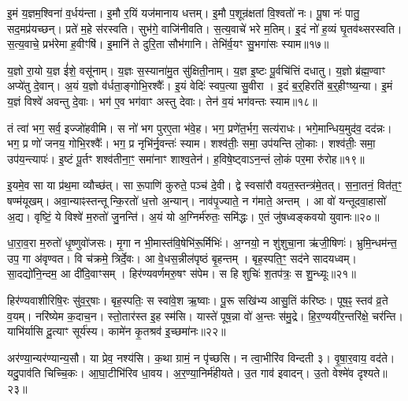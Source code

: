 इ॒मं य॒ज्ञम॒श्विना॑ व॒र्धय॑न्ता।
इ॒मौ र॒यिं यज॑मानाय धत्तम्।
इ॒मौ प॒शून्र॑क्षतां वि॒श्वतो॑ नः।
पू॒षा नः॑ पातु॒ सद॒मप्र॑यच्छन्।
प्रते॑ म॒हे स॑रस्वति।
सुभ॑गे॒ वाजि॑नीवति।
स॒त्य॒वाचे॑ भरे म॒तिम्।
इ॒दं नो॑ ह॒व्यं घृ॒तव॑थ्सरस्वति।
स॒त्य॒वाचे॒ प्रभ॑रेमा ह॒वीꣳषि॑।
इ॒मानि॑ ते दुरि॒ता सौभ॑गानि।
तेभि॑र्व॒यꣳ सु॒भगा॑सः स्याम॥१७॥\anuvakamend[व॒ज्र्यही॑नामृजी॒षं व्यृ॑ण्वति रक्षतु नो र॒यिꣳ सौभ॑गा॒न्येकं॑ च]

य॒ज्ञो रा॒यो य॒ज्ञ ई॑शे॒ वसू॑नाम्।
य॒ज्ञः स॒स्याना॑मु॒त सु॑क्षिती॒नाम्।
य॒ज्ञ इ॒ष्टः पू॒र्वचि॑त्तिं दधातु।
य॒ज्ञो ब्र॑ह्म॒ण्वाꣳ अप्ये॑तु दे॒वान्।
अ॒यं य॒ज्ञो व॑र्धता॒ङ्गोभि॒रश्वैः᳚।
इ॒यं वेदिः॑ स्वप॒त्या सु॒वीरा।
इ॒दं ब॒र्॒हिरति॑ ब॒र्॒हीꣳष्य॒न्या।
इ॒मं य॒ज्ञं विश्वे॑ अवन्तु दे॒वाः।
भग॑ ए॒व भग॑वाꣳ अस्तु देवाः।
तेन॑ व॒यं भग॑वन्तः स्याम॥१८॥

तं त्वा॑ भग॒ सर्व॒ इज्जो॑हवीमि।
स नो॑ भग पुरए॒ता भ॑वे॒ह।
भग॒ प्रणे॑त॒र्भग॒ सत्य॑राधः।
भगे॒मान्धिय॒मुद॑व॒ दद॑न्नः।
भग॒ प्र णो॑ जनय॒ गोभि॒रश्वैः᳚।
भग॒ प्र नृभि॑र्नृ॒वन्तः॑ स्याम।
शश्व॑तीः॒ समा॒ उप॑यन्ति लो॒काः।
शश्व॑तीः॒ समा॒ उप॑य॒न्त्यापः॑।
इ॒ष्टं पू॒र्तꣳ शश्व॑तीना॒ꣳ॒ समा॑नाꣳ शाश्व॒तेन॑।
ह॒विषे॒ष्ट्वा\-ऽन॒न्तं लो॒कं पर॒मा रु॑रोह॥१९॥

इ॒यमे॒व सा या प्र॑थ॒मा व्यौच्छ॑त्।
सा रू॒पाणि॑ कुरुते॒ पञ्च॑ दे॒वी।
द्वे स्वसा॑रौ वयत॒स्तन्त्र॑मे॒तत्।
स॒ना॒तनं॒ वित॑त॒ꣳ॒ षण्म॑यूखम्।
अवा॒न्याꣴस्तन्तून्कि॒रतो॑ ध॒त्तो अ॒न्यान्।
नाव॑पृ॒ज्याते॒ न ग॑माते॒ अन्तम्।
आ वो॑ यन्तूदवा॒हासो॑ अ॒द्य।
वृष्टिं॒ ये विश्वे॑ म॒रुतो॑ जु॒नन्ति॑।
अ॒यं यो अ॒ग्निर्म॑रुतः॒ समि॑द्धः।
ए॒तं जु॑षध्वङ्कवयो युवानः॥२०॥

धा॒रा॒व॒रा म॒रुतो॑ धृ॒ष्णुवो॑जसः।
मृ॒गा न भी॒मास्त॑वि॒षेभि॑\-रू॒र्मिभिः॑।
अ॒ग्नयो॒ न शु॑शुचा॒ना ऋ॑जी॒षिणः॑।
भ्रुमि॒न्धम॑न्त॒ उप॒ गा अ॑वृण्वत।
वि च॑क्रमे॒ त्रिर्दे॒वः।
आ वे॒धस॒न्नील॑पृष्ठं बृ॒हन्तम्।
बृह॒स्पति॒ꣳ॒ सद॑ने सादयध्वम्।
सा॒दद्यो॑नि॒न्दम॒ आ दी॑दि॒वाꣳसम्।
हिर॑ण्यवर्णमरु॒षꣳ स॑पेम।
स हि शुचिः॑ श॒तप॑त्रः॒ स शु॒न्ध्यूः॥२१॥

हिर॑ण्यवाशीरिषि॒रः सु॑व॒र्॒षाः।
बृह॒स्पतिः॒ स स्वा॑वे॒श ऋ॒ष्वाः।
पू॒रू सखि॑भ्य आसु॒तिं क॑रिष्ठः।
पूष॒ꣴ॒ स्तव॑ व्र॒ते व॒यम्।
नरि॑ष्येम क॒दाच॒न।
स्तो॒तार॑स्त इ॒ह स्म॑सि।
यास्ते॑ पूष॒न्ना वो॑ अ॒न्तः स॑मु॒द्रे।
हि॒र॒ण्ययी॑र॒न्तरि॑क्षे॒ चर॑न्ति।
याभि॑र्यासि दू॒त्याꣳ सूर्य॑स्य।
कामे॑न कृ॒तश्रव॑ इ॒च्छमा॑नः॥२२॥

अर॑ण्या॒न्यर॑ण्यान्य॒सौ।
या प्रेव॒ नश्य॑सि।
क॒था ग्रामं॒ न पृ॑च्छसि।
न त्वा॒भीरि॑व विन्दती ३।
वृ॒षा॒र॒वाय॒ वद॑ते।
यदु॒पाव॑ति चिच्चि॒कः।
आ॒घा॒टीभि॑रिव धा॒वय\sn{}।
अ॒र॒ण्या॒निर्म॑हीयते।
उ॒त गाव॑ इवादन्।
उ॒तो वेश्मे॑व दृश्यते॥२३॥

